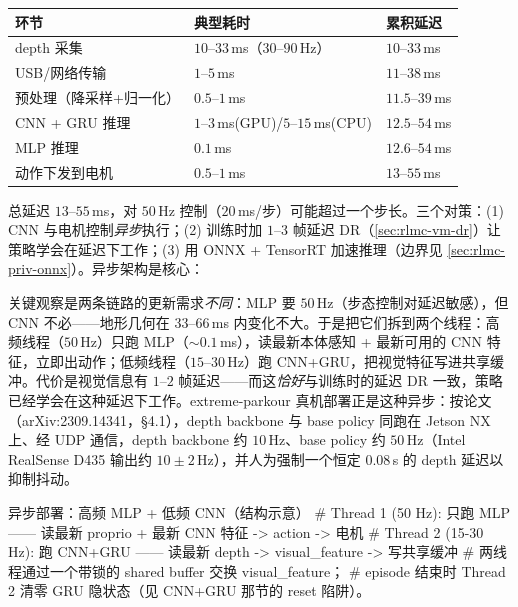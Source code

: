 \begin{center}
\small
\begin{tabular}{@{}lll@{}}
\toprule
环节 & 典型耗时 & 累积延迟 \\
\midrule
depth 采集 & $10$--$33$\,ms（$30$--$90$\,Hz） & $10$--$33$\,ms \\
USB/网络传输 & $1$--$5$\,ms & $11$--$38$\,ms \\
预处理（降采样+归一化） & $0.5$--$1$\,ms & $11.5$--$39$\,ms \\
CNN + GRU 推理 & $1$--$3$\,ms(GPU)/$5$--$15$\,ms(CPU) & $12.5$--$54$\,ms \\
MLP 推理 & $0.1$\,ms & $12.6$--$54$\,ms \\
动作下发到电机 & $0.5$--$1$\,ms & $13$--$55$\,ms \\
\bottomrule
\end{tabular}
\end{center}

总延迟 $13$--$55$\,ms，对 $50$\,Hz 控制（$20$\,ms/步）可能超过一个步长。三个对策：(1) CNN 与电机控制\emph{异步}执行；(2) 训练时加 $1$--$3$ 帧延迟 DR（\cref{sec:rlmc-vm-dr}）让策略学会在延迟下工作；(3) 用 ONNX + TensorRT 加速推理（边界见 \cref{sec:rlmc-priv-onnx}）。异步架构是核心：

\begin{insight}\label{ins:rlmc-vm-async}
关键观察是两条链路的更新需求\emph{不同}：MLP 要 $50$\,Hz（步态控制对延迟敏感），但 CNN 不必——地形几何在 $33$--$66$\,ms 内变化不大。于是把它们拆到两个线程：高频线程（$50$\,Hz）只跑 MLP（$\sim 0.1$\,ms），读最新本体感知 + 最新可用的 CNN 特征，立即出动作；低频线程（$15$--$30$\,Hz）跑 CNN+GRU，把视觉特征写进共享缓冲。代价是视觉信息有 $1$--$2$ 帧延迟——而这\emph{恰好}与训练时的延迟 DR 一致，策略已经学会在这种延迟下工作。extreme-parkour 真机部署正是这种异步：按论文（arXiv:2309.14341，\S4.1），depth backbone 与 base policy 同跑在 Jetson NX 上、经 UDP 通信，depth backbone 约 $10$\,Hz、base policy 约 $50$\,Hz（Intel RealSense D435 输出约 $10\pm 2$\,Hz），并人为强制一个恒定 $0.08$\,s 的 depth 延迟以抑制抖动。
\end{insight}

\begin{codebox}[Python]{异步部署：高频 MLP + 低频 CNN（结构示意）}
# Thread 1 (50 Hz): 只跑 MLP —— 读最新 proprio + 最新 CNN 特征 -> action -> 电机
# Thread 2 (15-30 Hz): 跑 CNN+GRU —— 读最新 depth -> visual_feature -> 写共享缓冲
# 两线程通过一个带锁的 shared buffer 交换 visual_feature；
# episode 结束时 Thread 2 清零 GRU 隐状态（见 CNN+GRU 那节的 reset 陷阱）。
\end{codebox}

